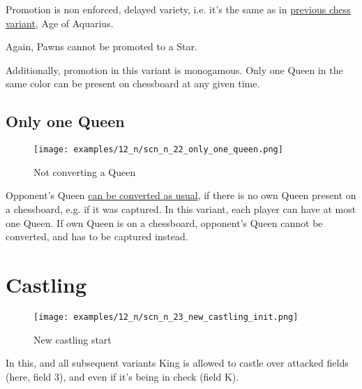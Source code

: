 Promotion is non enforced, delayed variety, i.e. it's the same as in
\hyperref[sec:Age of Aquarius/Promotion]{previous chess variant}, Age of Aquarius.

Again, Pawns cannot be promoted to a Star.

Additionally, promotion in this variant is monogamous.
Only one Queen in the same color can be present on chessboard at any given time.

\clearpage %

\subsection*{Only one Queen}
\label{sec:Nineteen/Sideways Pawns/Only one Queen}

\vspace*{-1.1\baselineskip}
\noindent
\begin{figure}[!h]
\texttt{[image: examples/12\_n/scn\_n\_22\_only\_one\_queen.png]}
\caption{Not converting a Queen}
\label{fig:scn_n_22_only_one_queen}
\end{figure}

Opponent's Queen
\hyperref[sec:Mayan Ascendancy/Pyramid/Conversion]{can be converted as usual},
if there is no own Queen present on a chessboard, e.g. if it was captured.
In this variant, each player can have at most one Queen. If own Queen is on
a chessboard, opponent's Queen cannot be converted, and has to be captured
instead.

\clearpage %

\section*{Castling}
\label{sec:Nineteen/Castling}

\vspace*{-1.7\baselineskip}
\noindent
\begin{figure}[!h]
\texttt{[image: examples/12\_n/scn\_n\_23\_new\_castling\_init.png]}
\vspace*{-1.4\baselineskip}
\caption{New castling start}
\label{fig:scn_n_23_new_castling_init}
\end{figure}

\vspace*{-0.7\baselineskip}
In this, and all subsequent variants King is allowed to castle over attacked fields
(here, field 3), and even if it's being in check (field K).

